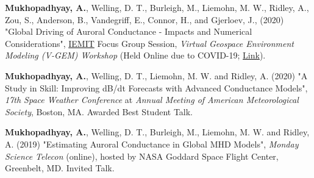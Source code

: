 \documentclass[10pt]{article}
\begin{document}
{{%


\textbf{Mukhopadhyay, A.}, Welling, D. T., Burleigh, M., Liemohn, M. W., Ridley, A., Zou, S., Anderson, B., Vandegriff, E., Connor, H., and Gjerloev, J., (2020) "Global Driving of Auroral Conductance - Impacts and Numerical Considerations", \href{https://gem.epss.ucla.edu/mediawiki/index.php/FG:_3D_Ionospheric_Electrodynamics_and_Its_Impact_on_the_Magnetosphere-Ionosphere-Thermosphere_Coupled_System}{IEMIT} Focus Group Session, \textit{Virtual Geospace Environment Modeling (V-GEM) Workshop} (Held Online due to COVID-19; \href{https://gem.epss.ucla.edu/mediawiki/index.php/FG:_3D_Ionospheric_Electrodynamics_and_Its_Impact_on_the_Magnetosphere-Ionosphere-Thermosphere_Coupled_System#2020_Virtual_GEM_workshop_-_updated_on_July_22.2C_2020}{\color{mich_gold}Link}). \vspace{0.5em}

\textbf{Mukhopadhyay, A.}, Welling, D. T., Liemohn, M. W. and Ridley, A. (2020) "A Study in Skill: Improving dB/dt Forecasts with Advanced Conductance Models", \textit{17th Space Weather Conference} at \textit{Annual Meeting of American Meteorological Society}, Boston, MA. {\color{mich_gold} Awarded Best Student Talk.} \vspace{0.5em}


\textbf{Mukhopadhyay, A.}, Welling, D. T., Burleigh, M., Liemohn, M. W. and Ridley, A. (2019) "Estimating Auroral Conductance in Global MHD Models", \textit{Monday Science Telecon} (online), hosted by NASA Goddard Space Flight Center, Greenbelt, MD. {\color{mich_gold} Invited Talk.} \vspace{0.5em}


}}
\end{document}
